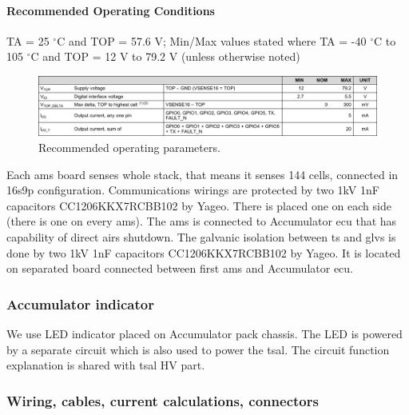 \paragraph{Recommended Operating Conditions}
TA = 25 $^\circ$C and TOP = 57.6 V; Min/Max values stated where TA = -40 $^\circ$C to 105 $^\circ$C and TOP = 12 V to 79.2 V (unless otherwise noted)
\begin{figure}[H]
	\centering
	\includegraphics[width=\textwidth]{./img/BMS-operatingparms.pdf}
	\caption{Recommended operating parameters.}
	\label{fig:BMS-op-params}
\end{figure}


Each \gls{ams} board senses whole stack, that means it senses 144 cells, connected in 16s9p configuration. Communications wirings are protected by two 1kV 1nF capacitors CC1206KKX7RCBB102 by Yageo. There is placed one on each side (there is one on every \gls{ams}). The \gls{ams} is connected to Accumulator \gls{ecu} that has capability of direct \glspl{air} shutdown. The galvanic isolation between \gls{ts} and \gls{glvs} is done by two 1kV 1nF capacitors CC1206KKX7RCBB102 by Yageo. It is located on separated board connected between first \gls{ams} and Accumulator \gls{ecu}.




\subsubsection{Accumulator indicator}

We use LED indicator placed on Accumulator pack chassis. The LED is powered by a separate circuit which is also used to power the \gls{tsal}. The circuit function explanation is shared with \gls{tsal} HV part. 

\subsubsection{Wiring, cables, current calculations, connectors}\label{subsec:acp_wiring}


